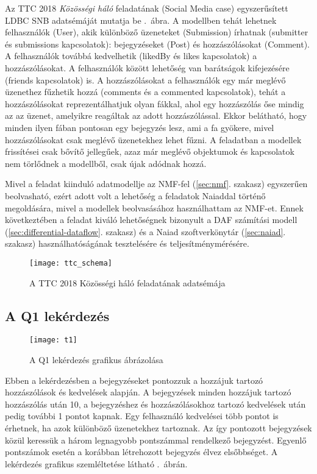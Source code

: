 Az TTC 2018 \emph{Közösségi háló} feladatának (Social Media case) egyszerűsített LDBC SNB adatsémáját mutatja be .~ábra.
A modellben tehát lehetnek felhasználók (\textsf{User}), akik különböző üzeneteket (\textsf{Submission}) írhatnak (\textsf{submitter} és \textsf{submissions} kapcsolatok): bejegyzéseket (\textsf{Post}) és hozzászólásokat (\textsf{Comment}).
A felhasználók továbbá kedvelhetik (\textsf{likedBy} és \textsf{likes} kapcsolatok) a hozzászólásokat. A felhasználók között lehetőség van barátságok kifejezésére (\textsf{friends} kapcsolatok) is. A hozzászólásokat a felhasználók egy már meglévő üzenethez fűzhetik hozzá (\textsf{comments} és a \textsf{commented} kapcsolatok), tehát a hozzászólásokat reprezentálhatjuk olyan fákkal, ahol egy hozzászólás őse mindig az az üzenet, amelyikre reagáltak az adott hozzászólással. Ekkor belátható, hogy minden ilyen fában pontosan egy bejegyzés lesz, ami a fa gyökere, mivel hozzászólásokat csak meglévő üzenetekhez lehet fűzni. A feladatban a modellek frissítései csak bővítő jellegűek, azaz már meglévő objektumok és kapcsolatok nem törlődnek a modellből, csak újak adódnak hozzá.

Mivel a feladat kiinduló adatmodellje az NMF-fel (\ref{sec:nmf}. szakasz) egyszerűen beolvasható, ezért adott volt a lehetőség a feladatok Naiaddal történő megoldására, mivel a modellek beolvasásához használhattam az NMF-et. Ennek következtében a feladat kiváló lehetőségnek bizonyult
a DAF számítási modell (\ref{sec:differential-dataflow}. szakasz) és 
a Naiad szoftverkönytár (\ref{sec:naiad}. szakasz)
használhatóságának tesztelésére és teljesítménymérésére.

\begin{figure}
	\centering
	\texttt{[image: ttc\_schema]}	
	\caption{A TTC 2018 Közösségi háló feladatának adatsémája}
	\label{fig:ttc-schema}
\end{figure}

\subsection{A Q1 lekérdezés}

\begin{figure}[ht]
	\centering
	\texttt{[image: t1]}	
	\caption{A Q1 lekérdezés grafikus ábrázolása}
	\label{fig:ttc-t1}
\end{figure}

Ebben a lekérdezésben a bejegyzéseket pontozzuk a hozzájuk tartozó hozzászólások és kedvelések alapján. A bejegyzések minden hozzájuk tartozó hozzászólás után 10, a bejegyzéshez és hozzászólásokhoz tartozó kedvelések után pedig további 1 pontot kapnak. Egy felhasználó kedvelései több pontot is érhetnek, ha azok különböző üzenetekhez tartoznak. Az így pontozott bejegyzések közül keressük a három legnagyobb pontszámmal rendelkező bejegyzést. Egyenlő pontszámok esetén a korábban létrehozott bejegyzés élvez elsőbbséget. A lekérdezés grafikus szemléltetése látható .~ábrán.


